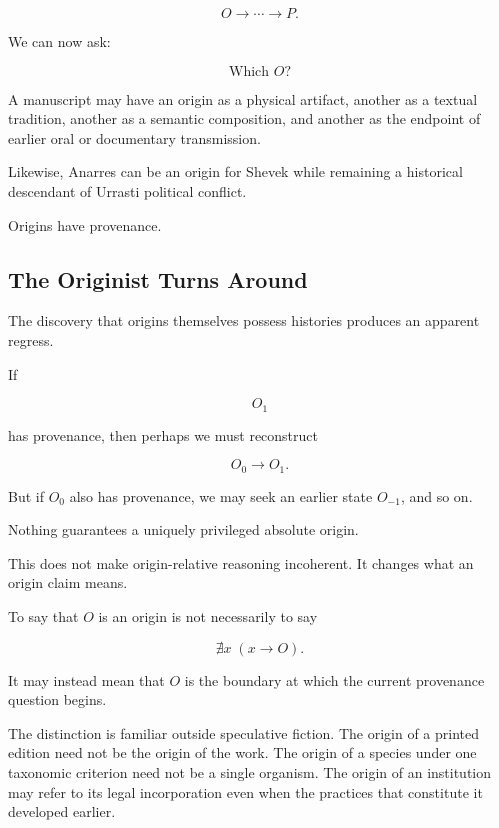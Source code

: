 \documentclass[
  11pt,
  a4paper,
  DIV=12,
  BCOR=0mm,
  parskip=half-
]{scrartcl}
\theoremstyle{definition}
\theoremstyle{plain}
\theoremstyle{remark}
\begin{document}
\[
  O
  \longrightarrow
  \cdots
  \longrightarrow
  P.
\]

We can now ask:

\[
  \text{Which }O?
\]

A manuscript may have an origin as a physical artifact, another as a textual
tradition, another as a semantic composition, and another as the endpoint of
earlier oral or documentary transmission.

Likewise, Anarres can be an origin for Shevek while remaining a historical
descendant of Urrasti political conflict.

Origins have provenance.


\subsection{The Originist Turns Around}
\label{sec:originist-turns}

The discovery that origins themselves possess histories produces an apparent
regress.

If

\[
  O_1
\]

has provenance, then perhaps we must reconstruct

\[
  O_0\longrightarrow O_1.
\]

But if \(O_0\) also has provenance, we may seek an earlier state \(O_{-1}\),
and so on.

Nothing guarantees a uniquely privileged absolute origin.

This does not make origin-relative reasoning incoherent. It changes what an
origin claim means.

To say that \(O\) is an origin is not necessarily to say

\[
  \nexists x\;(x\longrightarrow O).
\]

It may instead mean that \(O\) is the boundary at which the current
provenance question begins.

The distinction is familiar outside speculative fiction. The origin of a
printed edition need not be the origin of the work. The origin of a species
under one taxonomic criterion need not be a single organism. The origin of an
institution may refer to its legal incorporation even when the practices that
constitute it developed earlier.
\end{document}

